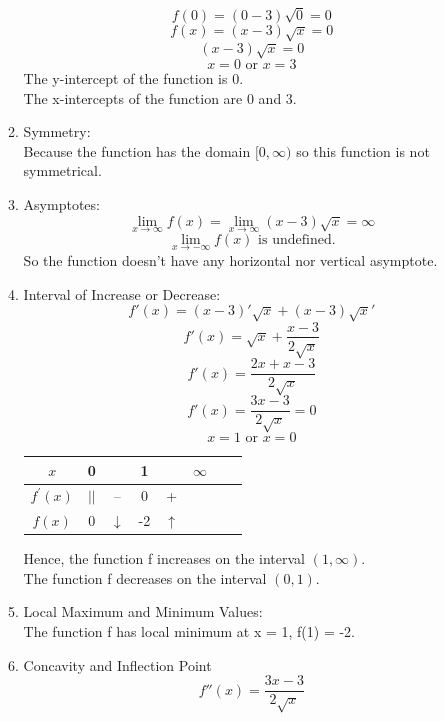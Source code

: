 \documentclass[12pt]{article}
\begin{document}
\begin{enumerate}
\begin{enumerate}
            \[f(0) = (0 - 3)\sqrt{0} = 0\]
            \[f(x) = (x-3)\sqrt{x} = 0\]
            \[(x-3)\sqrt{x} = 0\]
            \[x = 0 \text{ or } x = 3\]
            The y-intercept of the function is 0.\\
            The x-intercepts of the function are 0 and 3.
        \item Symmetry:\\
            Because the function has the domain $[0,\infty)$ so this function is not symmetrical.
        \item Asymptotes:
            \[\lim_{x \to \infty} f(x) = \lim_{x \to \infty} (x-3)\sqrt{x} = \infty \]
            \[\lim_{x \to -\infty} f(x) \text{ is undefined.}\] 
            So the function doesn't have any horizontal nor vertical asymptote.
        \item Interval of Increase or Decrease:
            \[f'(x) = (x-3)'\sqrt{x} + (x-3)\sqrt{x}'\]
            \[f'(x) = \sqrt{x} + \frac{x-3}{2\sqrt{x}}\]
            \[f'(x) = \frac{2x + x-3}{2\sqrt{x}}\]
            \[f'(x) = \frac{3x-3}{2\sqrt{x}} = 0\]
            \[x = 1 \text{ or } x = 0\]
            \begin{center}
                \begin{tabular}{c c c c c c c c}
                    $x$  & 0 & ~ &1 & ~ & $\infty$ \\ 
                    \hline 
                    $f^{\prime} (x)$ & $||$ & -- & 0 & + \\ 
                    \hline 
                    $f(x)$ & 0 & $\downarrow$ & -2 & $\uparrow$ & \\ 
                \end{tabular}    
            \end{center}
            Hence, the function f increases on the interval $(1,\infty)$.\\
            The function f decreases on the interval $(0,1)$.
        \item Local Maximum and Minimum Values:\\
            The function f has local minimum at x = 1, f(1) = -2.
        \item Concavity and Inflection Point
            \[f''(x) = \frac{3x-3}{2\sqrt{x}}\]
    \end{enumerate}
\end{enumerate}
\end{document}

